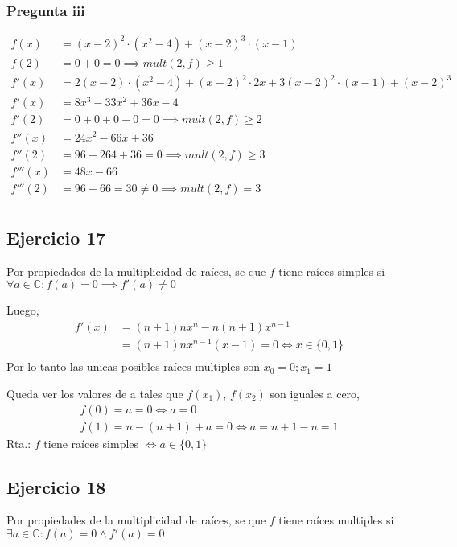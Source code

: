 \subsubsection{Pregunta iii}
\begin{align*}
    f(x) &= (x-2)^2 \cdot (x^2-4) + (x-2)^3 \cdot (x-1) \\
    f(2) &= 0 + 0 = 0 \implies mult(2,f) \geq 1 \\
    f'(x) &= 2(x-2) \cdot (x^2-4) + (x-2)^2 \cdot 2x + 3(x-2)^2 \cdot (x-1) + (x-2)^3 \\
    f'(x) &= 8x^3 -33x^2 +36x -4 \\
    f'(2) &= 0 + 0 + 0 + 0 = 0 \implies mult(2,f) \geq 2 \\
    f''(x) &= 24x^2 -66x +36 \\
    f''(2) &= 96 -264 +36 = 0 \implies mult(2,f) \geq 3 \\
    f'''(x) &= 48x - 66 \\
    f'''(2) &= 96 - 66 = 30 \neq 0 \implies mult(2,f) = 3 \\
\end{align*}

\subsection{Ejercicio 17}
Por propiedades de la multiplicidad de raíces, se que $ f $ tiene raíces simples si $ \forall a \in \mathbb{C}: f(a) = 0 \implies f'(a) \neq 0 $

Luego,
\begin{align*}
    f'(x) &= (n+1)n x^n -n(n+1)x^{n-1} \\
    &= (n+1)n x^{n-1} (x-1) = 0 \iff x \in \{ 0,1 \} \\
\end{align*}
Por lo tanto las unicas posibles raíces multiples son $ x_0 = 0; x_1 = 1 $

Queda ver los valores de a tales que $f(x_1)$, $f(x_2)$ son iguales a cero,
\begin{align*}
    f(0) = a = 0 \iff a = 0 \\
    f(1) = n-(n+1) + a = 0 \iff a = n+1-n = 1
\end{align*}
Rta.: $f$ tiene raíces simples $ \iff a \in \{ 0, 1 \} $

\subsection{Ejercicio 18}
Por propiedades de la multiplicidad de raíces, se que $ f $ tiene raíces multiples si $ \exists a \in \mathbb{C}: f(a) = 0 \wedge f'(a) = 0 $

